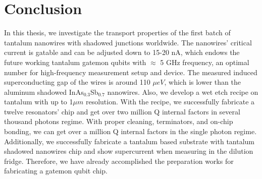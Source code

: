 \clearpage
\section{Conclusion}

In this thesis, we investigate the transport properties of the first batch of tantalum nanowires with shadowed junctions worldwide. The nanowires' critical current is gatable and can be adjusted down to 15-20 nA, which endows the future working tantalum gatemon qubits with $\approx$ 5 GHz frequency, an optimal number for high-frequency measurement setup and device. The measured induced superconducting gap of the wires is around 110 $\mu eV$, which is lower than the aluminum shadowed InAs$_{0.3}$Sb$_{0.7}$ nanowires. Also, we develop a wet etch recipe on tantalum with up to 1$\mu m$ resolution. With the recipe, we successfully fabricate a twelve resonators' chip and get over two million Q internal factors in several thousand photons regime. With proper cleaning, terminators, and on-chip bonding, we can get over a million Q internal factors in the single photon regime. Additionally, we successfully fabricate a tantalum based substrate with tantalum shadowed nanowires chip and show supercurrent when measuring in the dilution fridge. Therefore, we have already accomplished the preparation works for fabricating a gatemon qubit chip.